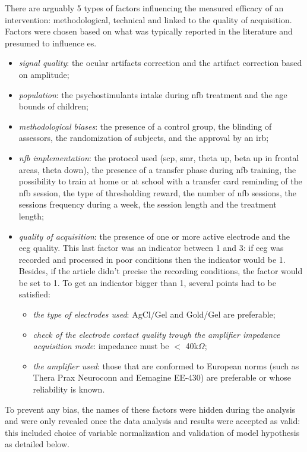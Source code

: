 There are arguably 5 types of factors influencing the measured efficacy of an intervention: methodological, technical and linked to the quality of acquisition.
Factors were chosen based on what was typically reported in the literature and presumed to influence \gls{es}.
\begin{itemize}
\item \textit{signal quality}: the ocular artifacts correction and the artifact correction based on amplitude; 
\item \textit{population}: the psychostimulants intake during \gls{nfb} treatment and the age bounds of children;
\item \textit{methodological biases}: the presence of a control group, the blinding of assessors, 
the randomization of subjects, and the approval by an \gls{irb};
\item \textit{\gls{nfb} implementation}: the protocol used (\gls{scp}, \gls{smr}, 
theta up, beta up in frontal areas, theta down), the presence of a transfer phase during \gls{nfb} training, the possibility to train at home 
or at school with a transfer card reminding of the \gls{nfb} session, 
the type of thresholding reward, the number of \gls{nfb} sessions, the sessions frequency during a week, the session length and the treatment length;
\item \textit{quality of acquisition}: the presence of one or more active electrode and the \gls{eeg} quality. 
This last factor was an indicator between 1 and 3: if \gls{eeg} was recorded and processed in poor conditions then the indicator would be 1. 
Besides, if the article didn't precise the recording conditions, the factor would be set to 1. To get an indicator bigger than 1, several 
points had to be satisfied:
\begin{itemize}
\item \textit{the type of electrodes used}: AgCl/Gel and Gold/Gel are preferable;
\item \textit{check of the electrode contact quality trough the amplifier impedance acquisition mode}: impedance must be $<$ 40k$\Omega$;  
\item \textit{the amplifier used}: those that are conformed to European norms (such as Thera Prax \textregistered 
Neuroconn and Eemagine EE-430) are preferable or whose reliability is known.
\end{itemize}
\end{itemize}

To prevent any bias, the names of these factors were hidden during the analysis and were only revealed once the data 
analysis and results were accepted as valid: this included choice of variable
normalization and validation of model hypothesis as detailed below.

